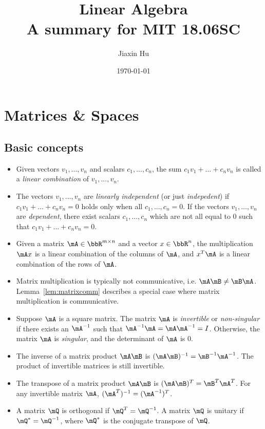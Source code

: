 \documentclass[11pt]{article}
\title{\textbf{Linear Algebra}\\A summary for MIT 18.06SC}
\date{\today}
\author{%
Jiaxin Hu
}
\theoremstyle{plain}
\theoremstyle{definition}
\begin{document}

\maketitle


\section{Matrices \& Spaces}
\subsection{Basic concepts}
\begin{itemize}
    \item Given vectors $v_1 ,...,v_n$ and scalars $c_1, ..., c_n$, the sum $c_1 v_1 + \dots + c_n v_n$ is called a \textit{linear combination} of $v_1,...,v_n$.
    \item The vectors  $v_1 ,...,v_n$  are \textit{linearly independent} (or just \textit{indepedent}) if $c_1 v_1 + \dots + c_n v_n = 0$ holds only when all  $c_1,...,c_n = 0$. If the vectors  $v_1 ,...,v_n$  are \textit{dependent}, there exist scalars $c_1, ..., c_n$ which are not all equal to 0 such that $c_1 v_1 + \dots + c_n v_n = 0$.
	\item Given a matrix $\mA \in \bbR^{m \times n}$ and a vector $x \in \bbR^{n}$,  the multiplication $\mA x$ is a linear combination of the columns of $\mA$, and $x^T \mA$ is a linear combination of the rows of $\mA$.
	\item Matrix multiplication is typically not communicative, i.e. $\mA \mB \neq \mB \mA$. Lemma~\ref{lem:matrixcomm} describes a special case where matrix multiplication is communicative.
	\item Suppose $\mA$ is a square matrix. The matrix $\mA$ is \textit{invertible} or \textit{non-singular} if there exists an $\mA^{-1}$ such that $\mA^{-1} \mA = \mA \mA^{-1} = I$. Otherwise, the matrix $\mA$ is \textit{singular}, and the determinant of $\mA$ is 0. 
	\item The inverse of a matrix product $\mA\mB$ is $(\mA \mB)^{-1} = \mB^{-1} \mA^{-1}$. The product of invertible matrices is still invertible.
	\item The transpose of a matrix product  $\mA\mB$ is $(\mA \mB)^{T} = \mB^{T} \mA^{T}$. For any invertible matrix $\mA$, $(\mA^T)^{-1} = (\mA^{-1})^T$.
	\item A matrix $\mQ$ is orthogonal if $\mQ^T = \mQ^{-1}$. A matrix $\mQ$ is unitary if $\mQ^* = \mQ^{-1}$, where $\mQ^*$ is the conjugate transpose of $\mQ$.
\end{itemize}
\end{document}
